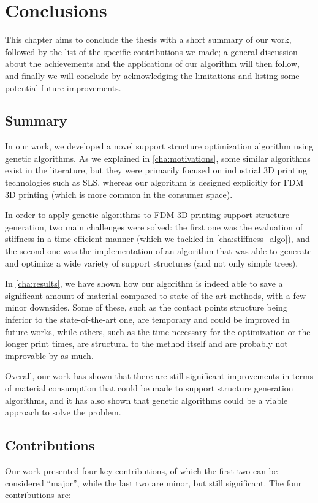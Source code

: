 \chapter{Conclusions}
\label{cha:conclusions}

This chapter aims to conclude the thesis with a short summary of our work, followed by
the list of the specific contributions we made; a general discussion about the achievements
and the applications of our algorithm will then follow, and finally we will conclude by acknowledging
the limitations and listing some potential future improvements.

\section{Summary}

In our work, we developed a novel support structure
optimization algorithm using genetic algorithms. As we explained in \cref{cha:motivations}, some similar algorithms exist in the literature, but
they were primarily focused on industrial 3D printing technologies such as SLS, 
whereas our algorithm is designed explicitly for FDM 3D printing (which is more 
common in the consumer space).

In order to apply genetic algorithms to FDM 3D printing support structure 
generation, two main challenges were solved: the first one was the evaluation 
of stiffness in a time-efficient manner (which we tackled in
\cref{cha:stiffness_algo}), and the second one was the implementation of an 
algorithm that was able to generate and optimize a wide variety of support structures (and 
not only simple trees).

In \cref{cha:results}, we have shown how our algorithm is
indeed able to save a significant amount of material compared to state-of-the-art
methods, with a few minor downsides. Some of these, such as the contact
points structure being inferior to the state-of-the-art one, are temporary and
could be improved in future works, while others, such as the time necessary 
for the optimization or the longer print times, are structural to the method 
itself and are probably not improvable by as much.

Overall, our work has shown that there are still significant improvements in 
terms of material consumption that could be made to support structure 
generation algorithms, and it has also shown that genetic algorithms could be 
a viable approach to solve the problem.


\section{Contributions}
Our work presented four key contributions, of which the first two can be considered
``major'', while the last two are minor, but still significant.
The four contributions are:

